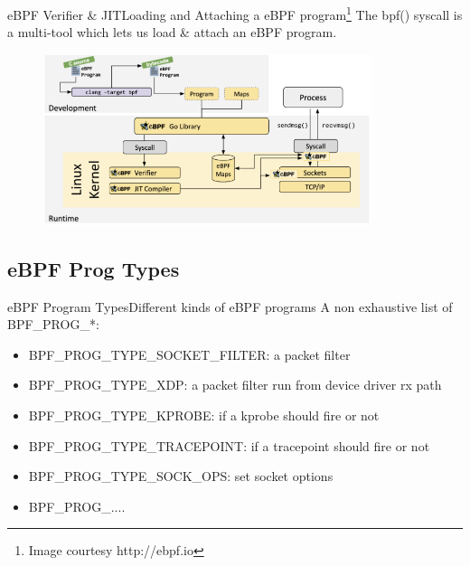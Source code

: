 \documentclass{beamer}
\begin{document}
\begin{frame}{eBPF Verifier \& JIT}{Loading and Attaching a eBPF program\footnote{Image courtesy http://ebpf.io}}
The \alert{bpf()} syscall is a multi-tool which lets us load \& attach an eBPF program.
\begin{figure}
    \centering
    \includegraphics[height=5cm]{e_verifier_jit.png}
\end{figure}
\end{frame}

\subsection{eBPF Prog Types}
\begin{frame}{eBPF Program Types}{Different kinds of eBPF programs}
A non exhaustive list of \alert{BPF\_PROG\_*}:
\vspace{0.5cm}
\begin{itemize}
    \item BPF\_PROG\_TYPE\_SOCKET\_FILTER: a packet filter
    \item BPF\_PROG\_TYPE\_XDP: a packet filter run from device driver rx path
    \item BPF\_PROG\_TYPE\_KPROBE: if a kprobe should fire or not
    \item BPF\_PROG\_TYPE\_TRACEPOINT: if a tracepoint should fire or not
    \item BPF\_PROG\_TYPE\_SOCK\_OPS: set socket options
    \item BPF\_PROG\_....
    
\end{itemize}
\end{frame}
\end{document}
